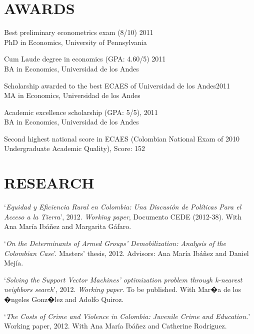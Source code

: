 \documentclass{res}
\begin{document}
\begin{resume}
						
\section{AWARDS}

Best preliminary econometrics exam (8/10) \hfill 2011\\
PhD in Economics, University of Pennsylvania

Cum Laude degree in economics (GPA: 4.60/5) \hfill 2011\\
BA in Economics, Universidad de los Andes

Scholarship awarded to the best ECAES of Universidad de los Andes\hfill  2011 \\
MA in Economics, Universidad de los Andes 
 
Academic excellence scholarship (GPA: 5/5), \hfill 2011\\
BA in Economics, Universidad de los Andes

Second highest national score in ECAES (Colombian National Exam of \hfill 2010\\       
Undergraduate Academic Quality), Score: 152

 						
\section{RESEARCH} 

								`\textit{Equidad y Eficiencia Rural en Colombia: Una Discusi\'on de Pol\'{i}ticas Para el Acceso a la Tierra}', 2012. \textit{Working paper}, Documento CEDE (2012-38). With Ana Mar\'{i}a Ib\'a\~nez and Margarita G\'afaro.

								`\textit{On the Determinants of Armed Groups' Demobilization: Analysis of the Colombian Case}'. Masters' thesis, 2012. Advisors: Ana Mar\'{i}a Ib\'a\~nez and Daniel Mej\'{i}a.

								`\textit{Solving the Support Vector Machines' optimization problem through \textit{k-nearest} neighbors search}', 2012. \textit{Working paper}. To be published. With Mar�a de los �ngeles Gonz�lez and Adolfo Quiroz.							

								`\textit{The Costs of Crime and Violence in Colombia: Juvenile Crime and Education.}' Working paper, 2012. With Ana Mar\'{i}a Ib\'a\~nez and Catherine Rodriguez. 


\end{resume}
\end{document}
